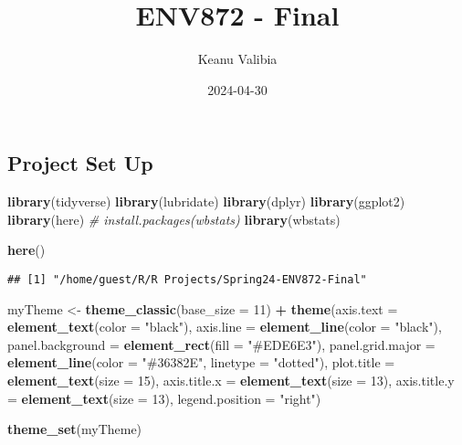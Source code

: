 \documentclass[
]{article}
\title{ENV872 - Final}
\author{Keanu Valibia}
\date{2024-04-30}
\newenvironment{Shaded}{\begin{snugshade}}{\end{snugshade}}
\newcommand{\AttributeTok}[1]{\textcolor[rgb]{0.13,0.29,0.53}{#1}}
\newcommand{\CommentTok}[1]{\textcolor[rgb]{0.56,0.35,0.01}{\textit{#1}}}
\newcommand{\DecValTok}[1]{\textcolor[rgb]{0.00,0.00,0.81}{#1}}
\newcommand{\FunctionTok}[1]{\textcolor[rgb]{0.13,0.29,0.53}{\textbf{#1}}}
\newcommand{\NormalTok}[1]{#1}
\newcommand{\OtherTok}[1]{\textcolor[rgb]{0.56,0.35,0.01}{#1}}
\newcommand{\SpecialCharTok}[1]{\textcolor[rgb]{0.81,0.36,0.00}{\textbf{#1}}}
\newcommand{\StringTok}[1]{\textcolor[rgb]{0.31,0.60,0.02}{#1}}
\begin{document}
\maketitle

\tableofcontents
\tableoffigures

\hypertarget{project-set-up}{%
\subsection{Project Set Up}\label{project-set-up}}

\begin{Shaded}
\begin{Highlighting}[]
\FunctionTok{library}\NormalTok{(tidyverse)}
\FunctionTok{library}\NormalTok{(lubridate)}
\FunctionTok{library}\NormalTok{(dplyr)}
\FunctionTok{library}\NormalTok{(ggplot2)}
\FunctionTok{library}\NormalTok{(here)}
\CommentTok{\# install.packages(\textquotesingle{}wbstats\textquotesingle{})}
\FunctionTok{library}\NormalTok{(wbstats)}

\FunctionTok{here}\NormalTok{()}
\end{Highlighting}
\end{Shaded}

\begin{verbatim}
## [1] "/home/guest/R/R Projects/Spring24-ENV872-Final"
\end{verbatim}

\begin{Shaded}
\begin{Highlighting}[]
\NormalTok{myTheme }\OtherTok{\textless{}{-}} \FunctionTok{theme\_classic}\NormalTok{(}\AttributeTok{base\_size =} \DecValTok{11}\NormalTok{) }\SpecialCharTok{+} \FunctionTok{theme}\NormalTok{(}\AttributeTok{axis.text =} \FunctionTok{element\_text}\NormalTok{(}\AttributeTok{color =} \StringTok{"black"}\NormalTok{),}
    \AttributeTok{axis.line =} \FunctionTok{element\_line}\NormalTok{(}\AttributeTok{color =} \StringTok{"black"}\NormalTok{),}
    \AttributeTok{panel.background =} \FunctionTok{element\_rect}\NormalTok{(}\AttributeTok{fill =} \StringTok{"\#EDE6E3"}\NormalTok{),}
    \AttributeTok{panel.grid.major =} \FunctionTok{element\_line}\NormalTok{(}\AttributeTok{color =} \StringTok{"\#36382E"}\NormalTok{,}
        \AttributeTok{linetype =} \StringTok{"dotted"}\NormalTok{), }\AttributeTok{plot.title =} \FunctionTok{element\_text}\NormalTok{(}\AttributeTok{size =} \DecValTok{15}\NormalTok{),}
    \AttributeTok{axis.title.x =} \FunctionTok{element\_text}\NormalTok{(}\AttributeTok{size =} \DecValTok{13}\NormalTok{), }\AttributeTok{axis.title.y =} \FunctionTok{element\_text}\NormalTok{(}\AttributeTok{size =} \DecValTok{13}\NormalTok{),}
    \AttributeTok{legend.position =} \StringTok{"right"}\NormalTok{)}

\FunctionTok{theme\_set}\NormalTok{(myTheme)}
\end{Highlighting}
\end{Shaded}
\end{document}
